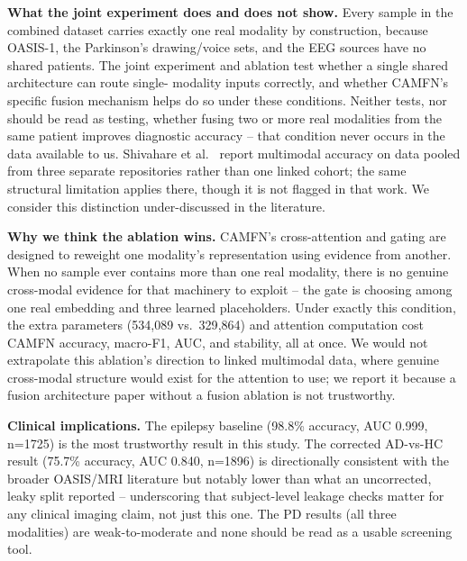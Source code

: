 \documentclass[conference]{IEEEtran}
\begin{document}
\textbf{What the joint experiment does and does not show.} Every sample
in the combined dataset carries exactly one real modality by
construction, because OASIS-1, the Parkinson's drawing/voice sets, and
the EEG sources have no shared patients. The joint experiment and
ablation test whether a single shared architecture can route single-
modality inputs correctly, and whether CAMFN's specific fusion mechanism
helps do so under these conditions. Neither tests, nor should be read as
testing, whether fusing two or more real modalities from the same
patient improves diagnostic accuracy -- that condition never occurs in
the data available to us. Shivahare et al.\ \cite{shivahare2026attention}
report multimodal accuracy on data pooled from three separate
repositories rather than one linked cohort; the same structural
limitation applies there, though it is not flagged in that work. We
consider this distinction under-discussed in the literature.

\textbf{Why we think the ablation wins.} CAMFN's cross-attention and
gating are designed to reweight one modality's representation using
evidence from another. When no sample ever contains more than one real
modality, there is no genuine cross-modal evidence for that machinery to
exploit -- the gate is choosing among one real embedding and three
learned placeholders. Under exactly this condition, the extra parameters
(534{,}089 vs.\ 329{,}864) and attention computation cost CAMFN accuracy,
macro-F1, AUC, and stability, all at once. We would not extrapolate this
ablation's direction to linked multimodal data, where genuine cross-modal
structure would exist for the attention to use; we report it because a
fusion architecture paper without a fusion ablation is not trustworthy.

\textbf{Clinical implications.} The epilepsy baseline (98.8\% accuracy,
AUC 0.999, n=1725) is the most trustworthy result in this study. The
corrected AD-vs-HC result (75.7\% accuracy, AUC 0.840, n=1896) is
directionally consistent with the broader OASIS/MRI literature but
notably lower than what an uncorrected, leaky split reported --
underscoring that subject-level leakage checks matter for any clinical
imaging claim, not just this one. The PD results (all three modalities)
are weak-to-moderate and none should be read as a usable screening tool.
\end{document}
